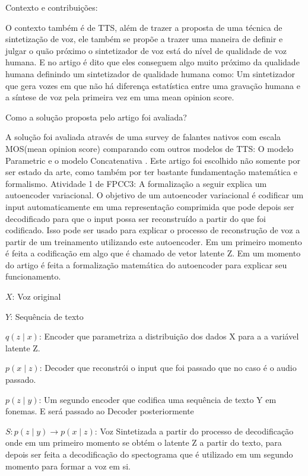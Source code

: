 \documentclass[a4paper,12pt]{article}
\begin{document}
			Contexto e contribuições:
						
			O contexto também é de TTS, além de trazer a proposta de uma técnica de sintetização de voz, ele também se propõe a trazer uma maneira de definir e julgar o quão próximo o sintetizador de voz está do nível de qualidade de voz humana. E no artigo é dito que eles conseguem algo muito próximo da qualidade humana definindo um sintetizador de qualidade humana como: Um sintetizador que gera vozes em que não há diferença estatística entre uma gravação humana e a síntese de voz pela primeira vez em uma mean opinion score.
			
			Como a solução proposta pelo artigo foi avaliada?
			
			A solução foi avaliada através de uma survey de falantes nativos com escala MOS(mean opinion score) comparando com outros modelos de TTS: O modelo Parametric \cite{zen2016parametric} e o modelo Concatenativa \cite{goncalvo2016concatenative}. Este artigo foi escolhido não somente por ser estado da arte, como também por ter bastante fundamentação matemática e formalismo.
			Atividade 1 de FPCC3: A formalização a seguir explica um autoencoder variacional. O objetivo de um autoencoder variacional é codificar um input automaticamente em uma representação comprimida que pode depois ser decodificado para que o input possa ser reconstruído a partir do que foi codificado. Isso pode ser usado para explicar o processo de reconstrução de voz a partir de um treinamento utilizando este autoencoder. Em um primeiro momento é feita a codificação em algo que é chamado de vetor latente Z. Em um momento do artigo é feita a formalização matemática do autoencoder para explicar seu funcionamento.

			$X$: Voz original
			
			$Y$: Sequência de texto
			
			$q(z \mid x)$: Encoder que parametriza a distribuição dos dados X para a a variável latente Z.
			
			$p(x \mid z)$: Decoder que reconstrói o input que foi passado que no caso é o audio passado.
				
			$p(z \mid y)$: Um segundo encoder que codifica uma sequência de texto Y em fonemas. E será passado ao Decoder posteriormente
			
			$S: p(z \mid y) \rightarrow  p(x \mid z)$: Voz Sintetizada a partir do processo de decodificação onde em um primeiro momento se obtém o latente Z a partir do texto, para depois ser feita a decodificação do spectograma que é utilizado em um segundo momento para formar a voz em si.
			
\end{document}
